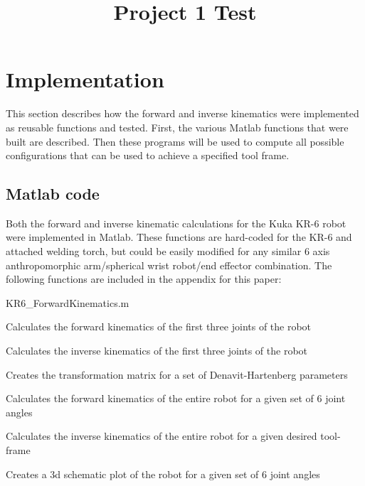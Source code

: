 \documentclass[conference]{IEEEtran}
\begin{document}
\title{Project 1 Test}

\author{
}

\maketitle






\section{Implementation}
This section describes how the forward and inverse kinematics were implemented as reusable functions and tested. First, the various Matlab functions that were built are described. Then these programs will be used to compute all possible configurations that can be used to achieve a specified tool frame.

\subsection{Matlab code}
Both the forward and inverse kinematic calculations for the Kuka KR-6 robot were implemented in Matlab. These functions are hard-coded for the KR-6 and attached welding torch, but could be easily modified for any similar 6 axis anthropomorphic arm/spherical wrist robot/end effector combination. The following functions are included in the appendix for this paper:
\begin{labeling}{KR6\_ForwardKinematics.m}
	\item[anthroArmForward.m] Calculates the forward kinematics of the first three joints of the robot
	\item[anthroArmInverse.m] Calculates the inverse kinematics of the first three joints of the robot
	\item[dhTransformLiteral.m] Creates the transformation matrix for a set of Denavit-Hartenberg parameters 
	\item[KR6\_ForwardKinematics.m] Calculates the forward kinematics of the entire robot for a given set of 6 joint angles
	\item[KR6\_InverseKinematics.m] Calculates the inverse kinematics of the entire robot for a given desired tool-frame
	\item[plotRobot.m] Creates a 3d schematic plot of the robot for a given set of 6 joint angles
\end{labeling}
\end{document}
